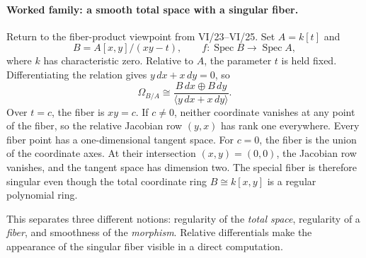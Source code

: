 \paragraph{Worked family: a smooth total space with a singular fiber.}
Return to the fiber-product viewpoint from VI/23--VI/25. Set
\(A=k[t]\) and
\[
 B=A[x,y]/(xy-t),\qquad
 f:\operatorname{Spec}B\longrightarrow\operatorname{Spec}A,
\]
where \(k\) has characteristic zero. Relative to \(A\), the
parameter \(t\) is held fixed. Differentiating the relation gives
\(y\,dx+x\,dy=0\), so
\[
 \Omega_{B/A}\cong
 \frac{B\,dx\oplus B\,dy}{\langle y\,dx+x\,dy\rangle}.
\]
Over \(t=c\), the fiber is \(xy=c\). If \(c\ne0\), neither
coordinate vanishes at any point of the fiber, so the relative
Jacobian row \((y,x)\) has rank one everywhere. Every fiber point
has a one-dimensional tangent space. For \(c=0\), the fiber is
the union of the coordinate axes. At their intersection
\((x,y)=(0,0)\), the Jacobian row vanishes, and the tangent
space has dimension two. The special fiber is therefore singular
even though the total coordinate ring \(B\cong k[x,y]\) is a
regular polynomial ring.

This separates three different notions: regularity of the
\emph{total space}, regularity of a \emph{fiber}, and smoothness
of the \emph{morphism}. Relative differentials make the
appearance of the singular fiber visible in a direct computation.
